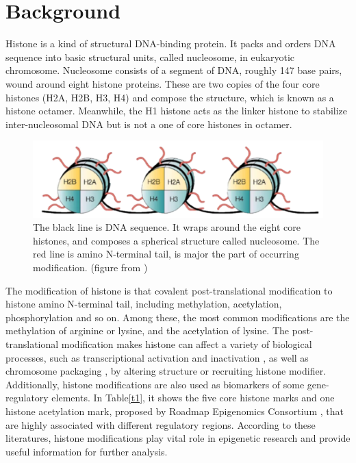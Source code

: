 \hspace{24pt}

\section{Background}
Histone is a kind of structural DNA-binding protein. It packs and orders DNA sequence into basic structural units, called nucleosome, in eukaryotic chromosome. Nucleosome consists of a segment of DNA, roughly 147 base pairs, wound around eight histone proteins. These are two copies of the four core histones (H2A, H2B, H3, H4) and compose the structure, which is known as a histone octamer. Meanwhile, the H1 histone acts as the linker histone to stabilize inter-nucleosomal DNA but is not a one of core histones in octamer.

\begin{figure}[H]
    \centering
    \includegraphics[width=1\columnwidth]{body/figure/figure1.png}
    \captionsetup{labelfont=bf}
    \renewcommand{\baselinestretch}{1.0}
    \caption[Structure of nucleosome]{The black line is DNA sequence. It wraps around the eight core histones, and composes a spherical structure called nucleosome. The red line is amino N-terminal tail, is major the part of occurring modification. (figure from \cite{marks2001histone})}
    \label{f1}
\end{figure}

The modification of histone is that covalent post-translational modification to histone amino N-terminal tail, including methylation, acetylation, phosphorylation and so on. Among these, the most common modifications are the methylation of arginine or lysine, and the acetylation of lysine. The post-translational modification makes histone can affect a variety of biological processes, such as transcriptional activation and inactivation \cite{luger1997crystal}, as well as chromosome packaging \cite{peterson2004histones}, by altering structure \cite{allfrey1964acetylation} or recruiting histone modifier. Additionally, histone modifications are also used as biomarkers of some gene-regulatory elements. In Table\ref{t1}, it shows the five core histone marks and one histone acetylation mark, proposed by Roadmap Epigenomics Consortium \cite{kundaje2015integrative}, that are highly associated with different regulatory regions. According to these literatures, histone modifications play vital role in epigenetic research and provide useful information for further analysis.

